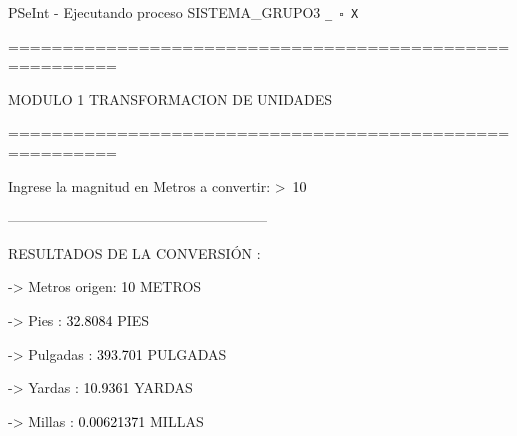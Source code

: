 \documentclass[12pt,a4paper]{article}
\newcommand{\consola}[1]{\noindent\textcolor{pseString}{#1}}
\newcommand{\entrada}[1]{\textcolor{black}{#1}}
\newenvironment{PSeIntWindow}{%
	\begin{tcolorbox}[
		breakable,
		enhanced,
		colback=white,
		colframe=black!60,
		boxrule=0.5pt,
		arc=1mm,
		left=0mm,
		right=0mm,
		top=0mm,
		bottom=2mm,
		width=\textwidth
		]
	}{%
	\end{tcolorbox}
}
\newcommand{\BarraPSeInt}{%
	\colorbox{gray!20}{%
		\parbox{\dimexpr\textwidth-2\fboxsep\relax}{%
			\small
			\textcolor{pseString}{\faPlayCircle}
			\hspace{0.3em}
			PSeInt - Ejecutando proceso SISTEMA\_GRUPO3
			\hfill
			\texttt{\_ \hspace{0.5em} \(\square\) \hspace{0.5em} X}
		}
	}
}
\begin{document}
	\begin{PSeIntWindow}
		
		\BarraPSeInt
		
		\vspace{0.2cm}
		
		\ttfamily
		\small
		
		\consola{========================================================}\par
		
		\begin{center}
			\textcolor{pseString}{MODULO 1 \hspace{1cm} TRANSFORMACION DE UNIDADES}
		\end{center}
		
		\consola{========================================================}\par
		
		\vspace{0.4cm}
		
		\consola{Ingrese la magnitud en Metros a convertir: \textgreater\ }\entrada{10}\par
		
		\vspace{0.4cm}
		
		\consola{--------------------------------------------------------}\par
		
		\vspace{0.2cm}
		
		\consola{RESULTADOS DE LA CONVERSIÓN :}\par
		
		\vspace{0.2cm}
		
		\consola{\hspace*{0.5cm}-> Metros origen: }\entrada{10}\consola{ METROS}\par
		
		\consola{\hspace*{0.5cm}-> Pies : }\entrada{32.8084}\consola{ PIES}\par
		
		\consola{\hspace*{0.5cm}-> Pulgadas : }\entrada{393.701}\consola{ PULGADAS}\par
		
		\consola{\hspace*{0.5cm}-> Yardas : }\entrada{10.9361}\consola{ YARDAS}\par
		
		\consola{\hspace*{0.5cm}-> Millas : }\entrada{0.00621371}\consola{ MILLAS}\par
		

\end{PSeIntWindow}
\end{document}
